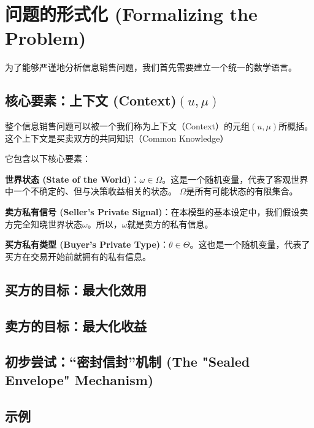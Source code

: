 \section{问题的形式化 (Formalizing the Problem)}

为了能够严谨地分析信息销售问题，我们首先需要建立一个统一的数学语言。

\subsection{核心要素：上下文 (Context)$(u,\mu)$}

整个信息销售问题可以被一个我们称为上下文（Context）的元组$(u, \mu)$所概括。这个上下文是买卖双方的共同知识（Common Knowledge）

它包含以下核心要素：

\textbf{世界状态 (State of the World)}：$\omega \in \Omega$。这是一个随机变量，代表了客观世界中一个不确定的、但与决策收益相关的状态。
$\Omega$是所有可能状态的有限集合。

\textbf{卖方私有信号 (Seller's Private Signal)}：在本模型的基本设定中，我们假设卖方完全知晓世界状态$\omega$。所以，$\omega$就是卖方的私有信息。

\textbf{买方私有类型 (Buyer's Private Type)}：$\theta \in \Theta$。这也是一个随机变量，代表了买方在交易开始前就拥有的私有信息。

\subsection{买方的目标：最大化效用}

\subsection{卖方的目标：最大化收益}

\subsection{初步尝试：“密封信封”机制 (The "Sealed Envelope" Mechanism)}

\subsection{示例}